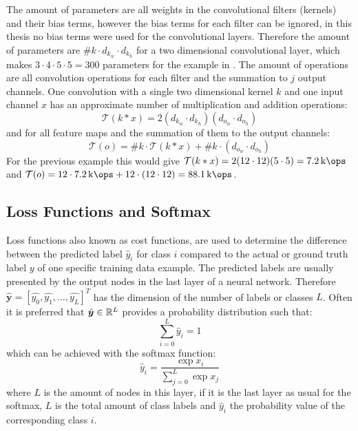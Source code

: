 The amount of parameters are all weights in the convolutional filters (kernels) and their bias terms, however the bias terms for each filter can be ignored, in this thesis no bias terms were used for the convolutional layers.
Therefore the amount of parameters are $\#k \cdot d_{k_w} \cdot d_{k_h}$ for a two dimensional convolutional layer, which makes $3 \cdot 4 \cdot 5 \cdot 5 = 300$ parameters for the example in .
The amount of operations are all convolution operations for each filter and the summation to $j$ output channels.
One convolution with a single two dimensional kernel $k$ and one input channel $x$ has an approximate number of multiplication and addition operations:
\begin{equation}
  \mathcal{T}(k * x) = 2(d_{k_w} \cdot d_{k_h}) (d_{o_w} \cdot d_{o_h})
\end{equation}
and for all feature maps and the summation of them to the output channels:
\begin{equation}
  \mathcal{T}(o) = \#k \cdot \mathcal{T}(k * x) + \#k \cdot (d_{o_w} \cdot d_{o_h})
\end{equation}
For the previous example this would give $\mathcal{T}(k * x) = 2 (12 \cdot 12) (5 \cdot 5) = \SI{7.2}{\kilo\ops}$ and $\mathcal{T}(o) = 12 \cdot \SI{7.2}{\kilo\ops} + 12 \cdot (12 \cdot 12) = \SI{88.1}{\kilo\ops}$.



\subsection{Loss Functions and Softmax}
Loss functions also known as cost functions, are used to determine the difference between the predicted label $\hat{y}_i$ for class $i$ compared to the actual or ground truth label $y$ of one specific training data example.
The predicted labels are usually presented by the output nodes in the last layer of a neural network.
Therefore $\hat{\bm{y}} = [\hat{y_0}, \hat{y_1}, \dots, \hat{y_L}]^T$ has the dimension of the number of labels or classes $L$.
Often it is preferred that $\hat{\bm{y}} \in \mathbb{R}^L$ provides a probability distribution such that:
\begin{equation}
  \sum_{i=0}^L \hat{y}_i = 1
\end{equation}
which can be achieved with the softmax function:
\begin{equation}\label{eq:nn_theory_softmax}
  \hat{y}_i = \frac{\exp{x_i}}{\sum_{j=0}^{L}\exp{x_j}}
\end{equation}
where $L$ is the amount of nodes in this layer, if it is the last layer as usual for the softmax, $L$ is the total amount of class labels and $\hat{y}_i$ the probability value of the corresponding class $i$.


